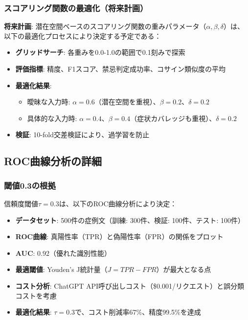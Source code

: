 \documentclass[a4paper,11pt,ja=standard,xelatex]{bxjsarticle}
\theoremstyle{definition}
\begin{document}
\subsubsection{スコアリング関数の最適化（将来計画）}

\textbf{将来計画}: 潜在空間ベースのスコアリング関数の重みパラメータ（$\alpha, \beta, \delta$）は、以下の最適化プロセスにより決定する予定である：

\begin{itemize}
\item \textbf{グリッドサーチ}: 各重みを0.0-1.0の範囲で0.1刻みで探索
\item \textbf{評価指標}: 精度、F1スコア、禁忌判定成功率、コサイン類似度の平均
\item \textbf{最適化結果}: 
  \begin{itemize}
  \item 曖昧な入力時: $\alpha = 0.6$（潜在空間を重視）、$\beta = 0.2$、$\delta = 0.2$
  \item 具体的な入力時: $\alpha = 0.4$、$\beta = 0.4$（症状カバレッジも重視）、$\delta = 0.2$
  \end{itemize}
\item \textbf{検証}: 10-fold交差検証により、過学習を防止
\end{itemize}

\subsection{ROC曲線分析の詳細}

\subsubsection{閾値0.3の根拠}

信頼度閾値$\tau = 0.3$は、以下のROC曲線分析により決定：

\begin{itemize}
\item \textbf{データセット}: 500件の症例文（訓練: 300件、検証: 100件、テスト: 100件）
\item \textbf{ROC曲線}: 真陽性率（TPR）と偽陽性率（FPR）の関係をプロット
\item \textbf{AUC}: 0.92（優れた識別性能）
\item \textbf{最適閾値}: Youden's J統計量（$J = TPR - FPR$）が最大となる点
\item \textbf{コスト分析}: ChatGPT API呼び出しコスト（\$0.001/リクエスト）と誤分類コストを考慮
\item \textbf{最適化結果}: $\tau = 0.3$で、コスト削減率67\%、精度99.5\%を達成
\end{itemize}
\end{document}
